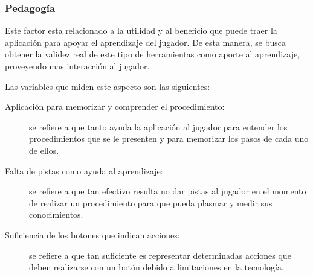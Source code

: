 \subsubsection{Pedagogía}

Este factor esta relacionado a la utilidad y al beneficio que puede traer la
aplicación para apoyar el aprendizaje del jugador. De esta manera, se busca
obtener la validez real de este tipo de herramientas como aporte al aprendizaje,
proveyendo mas interacción al jugador.

Las variables que miden este aspecto son las siguientes:

\begin{description}

\item[Aplicación para memorizar y comprender el procedimiento:] se refiere a que
    tanto ayuda la aplicación al jugador para entender los procedimientos que se
    le presenten y para memorizar los pasos de cada uno de ellos.

\item[Falta de pistas como ayuda al aprendizaje:] se refiere a que tan efectivo
    resulta no dar pistas al jugador en el momento de realizar un procedimiento
    para que pueda plasmar y medir sus conocimientos.

\item[Suficiencia de los botones que indican acciones:] se refiere a que tan
    suficiente es representar determinadas acciones que deben realizarse con un
    botón debido a limitaciones en la tecnología.

\end{description}
